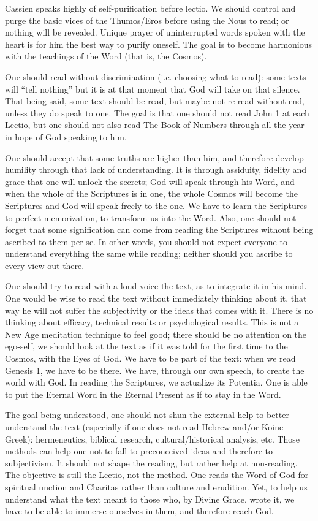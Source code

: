 Cassien speaks highly of self-purification before lectio. We should control and purge the basic vices of the Thumos/Eros before using the Nous to read; or nothing will be revealed. Unique prayer of uninterrupted words spoken with the heart is for him the best way to purify oneself. The goal is to become harmonious with the teachings of the Word (that is, the Cosmos).

One should read without discrimination (i.e. choosing what to read): some texts will ``tell nothing” but it is at that moment that God will take on that silence. That being said, some text should be read, but maybe not re-read without end, unless they do speak to one. The goal is that one should not read John 1 at each Lectio, but one should not also read The Book of Numbers through all the year in hope of God speaking to him.

One should accept that some truths are higher than him, and therefore develop humility through that lack of understanding. It is through assiduity, fidelity and grace that one will unlock the secrets; God will speak through his Word, and when the whole of the Scriptures is in one, the whole Cosmos will become the Scriptures and God will speak freely to the one. We have to learn the Scriptures to perfect memorization, to transform us into the Word. Also, one should not forget that some signification can come from reading the Scriptures without being ascribed to them per se. In other words, you should not expect everyone to understand everything the same while reading; neither should you ascribe to every view out there.

One should try to read with a loud voice the text, as to integrate it in his mind. One would be wise to read the text without immediately thinking about it, that way he will not suffer the subjectivity or the ideas that comes with it. There is no thinking about efficacy, technical results or psychological results. This is not a New Age meditation technique to feel good; there should be no attention on the ego-self, we should look at the text as if it was told for the first time to the Cosmos, with the Eyes of God. We have to be part of the text: when we read Genesis 1, we have to be there. We have, through our own speech, to create the world with God. In reading the Scriptures, we actualize its Potentia. One is able to put the Eternal Word in the Eternal Present as if to stay in the Word.

The goal being understood, one should not shun the external help to better understand the text (especially if one does not read Hebrew and/or Koine Greek): hermeneutics, biblical research, cultural/historical analysis, etc. Those methods can help one not to fall to preconceived ideas and therefore to subjectivism. It should not shape the reading, but rather help at non-reading. The objective is still the Lectio, not the method. One reads the Word of God for spiritual unction and Charitas rather than culture and erudition. Yet, to help us understand what the text meant to those who, by Divine Grace, wrote it, we have to be able to immerse ourselves in them, and therefore reach God.

